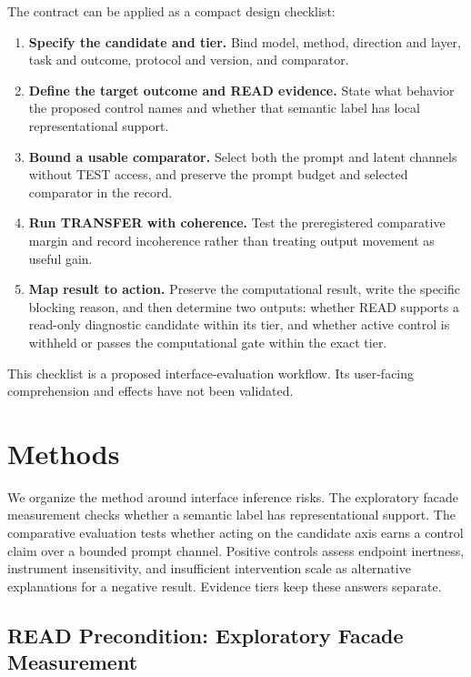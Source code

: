 \documentclass[sigconf]{acmart}
\begin{document}
The contract can be applied as a compact design checklist:
\begin{enumerate}
  \item \textbf{Specify the candidate and tier.} Bind model, method, direction and layer, task and outcome, protocol and version, and comparator.
  \item \textbf{Define the target outcome and READ evidence.} State what behavior the proposed control names and whether that semantic label has local representational support.
  \item \textbf{Bound a usable comparator.} Select both the prompt and latent channels without TEST access, and preserve the prompt budget and selected comparator in the record.
  \item \textbf{Run TRANSFER with coherence.} Test the preregistered comparative margin and record incoherence rather than treating output movement as useful gain.
  \item \textbf{Map result to action.} Preserve the computational result, write the specific blocking reason, and then determine two outputs: whether READ supports a read-only diagnostic candidate within its tier, and whether active control is withheld or passes the computational gate within the exact tier.
\end{enumerate}
This checklist is a proposed interface-evaluation workflow. Its user-facing comprehension and effects have not been validated.

\section{Methods}
\label{sec:methods}

We organize the method around interface inference risks. The exploratory facade measurement checks whether a semantic label has representational support. The comparative evaluation tests whether acting on the candidate axis earns a control claim over a bounded prompt channel. Positive controls assess endpoint inertness, instrument insensitivity, and insufficient intervention scale as alternative explanations for a negative result. Evidence tiers keep these answers separate.

\subsection{READ Precondition: Exploratory Facade Measurement}
\end{document}
